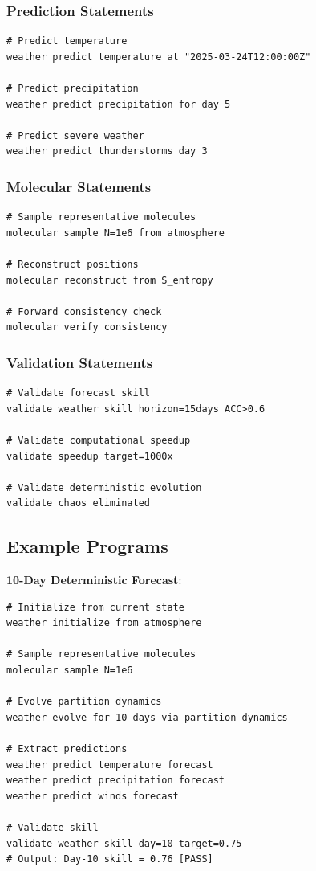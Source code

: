 \documentclass[twocolumn,10pt,a4paper]{article}
\theoremstyle{definition}
\theoremstyle{remark}
\begin{document}
\subsubsection{Prediction Statements}

\begin{lstlisting}
# Predict temperature
weather predict temperature at "2025-03-24T12:00:00Z"

# Predict precipitation
weather predict precipitation for day 5

# Predict severe weather
weather predict thunderstorms day 3
\end{lstlisting}

\subsubsection{Molecular Statements}

\begin{lstlisting}
# Sample representative molecules
molecular sample N=1e6 from atmosphere

# Reconstruct positions
molecular reconstruct from S_entropy

# Forward consistency check
molecular verify consistency
\end{lstlisting}

\subsubsection{Validation Statements}

\begin{lstlisting}
# Validate forecast skill
validate weather skill horizon=15days ACC>0.6

# Validate computational speedup
validate speedup target=1000x

# Validate deterministic evolution
validate chaos eliminated
\end{lstlisting}

\subsection{Example Programs}

\textbf{10-Day Deterministic Forecast}:
\begin{lstlisting}
# Initialize from current state
weather initialize from atmosphere

# Sample representative molecules
molecular sample N=1e6

# Evolve partition dynamics
weather evolve for 10 days via partition dynamics

# Extract predictions
weather predict temperature forecast
weather predict precipitation forecast
weather predict winds forecast

# Validate skill
validate weather skill day=10 target=0.75
# Output: Day-10 skill = 0.76 [PASS]
\end{lstlisting}
\end{document}
